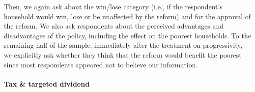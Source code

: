 \documentclass[12pt]{article} %
\begin{document}

Then, we again ask about the win/lose category (i.e., if the respondent's household would win, lose or be unaffected by the reform) and for the approval of the reform. We also ask respondents about the perceived advantages and disadvantages of the policy, including the effect on the poorest households. To the remaining half of the sample, immediately after the treatment on progressivity, we explicitly ask whether they think that the reform would benefit the poorest since most respondents appeared not to believe our information. %

\paragraph{Tax \& targeted dividend}

\end{document}
